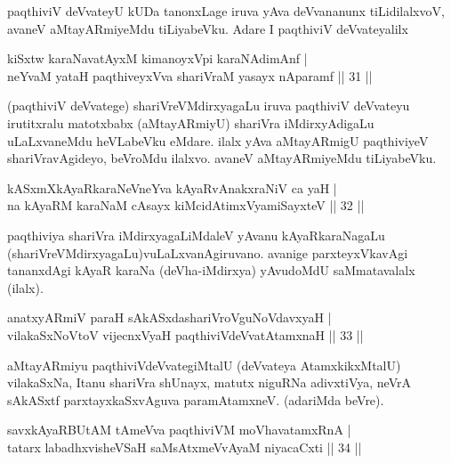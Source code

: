 \begin{artha}
paqthiviV deVvateyU kUDa tanonxLage iruva yAva deVvananunx tiLidilalxvoV, avaneV aMtayARmiyeMdu tiLiyabeVku. Adare I paqthiviV deVvateyalilx
\end{artha}


\begin{shl}
kiSxtw karaNavatAyxM kimanoyxV\s pi karaNAdimAnf |\\
neYvaM yataH paqthiveyxVva shariVraM yasayx nAparamf \hfill || 31 ||
\end{shl}

\begin{artha}
(paqthiviV deVvatege) shariVreVMdirxyagaLu iruva paqthiviV deVvateyu irutitxralu matotxbabx (aMtayARmiyU) shariVra iMdirxyAdigaLu uLaLxvaneMdu heVLabeVku eMdare. ilalx yAva aMtayARmigU paqthiviyeV shariVravAgideyo, beVroMdu ilalxvo. avaneV aMtayARmiyeMdu tiLiyabeVku.
\end{artha}

\begin{shl}
kASxmXkAyaRkaraNeVneYva kAyaRvAnakxraNiV ca yaH |\\
na kAyaRM karaNaM cAsayx kiMcidAtimxVyamiSayxteV \hfill || 32 ||
\end{shl}

\begin{artha}
paqthiviya shariVra iMdirxyagaLiMdaleV yAvanu kAyaRkaraNagaLu (shariVreVMdirxyagaLu)vuLaLxvanAgiruvano. avanige parxteyxVkavAgi tananxdAgi kAyaR karaNa (deVha-iMdirxya) yAvudoMdU saMmatavalalx (ilalx).
\end{artha}


\begin{shl}
anatxyARmiV paraH sAkASxdashariVroV\s guNoV\s davxyaH |\\
vilakaSxNoV\s toV vijecnxVyaH paqthiviVdeVvatAtamxnaH \hfill || 33 ||
\end{shl}

\begin{artha}
aMtayARmiyu paqthiviVdeVvategiMtalU (deVvateya AtamxkikxMtalU) vilakaSxNa, Itanu shariVra shUnayx, matutx niguRNa adivxtiVya, neVrA  sAkASxtf parxtayxkaSxvAguva paramAtamxneV. (adariMda beVre).
\end{artha}

\begin{shl}
savxkAyaRBUtAM tAmeVva paqthiviVM moVhavatamxRnA |\\
tatarx labadhxvisheVSaH saMsAtxmeVvAyaM niyacaCxti \hfill || 34 ||
\end{shl}

